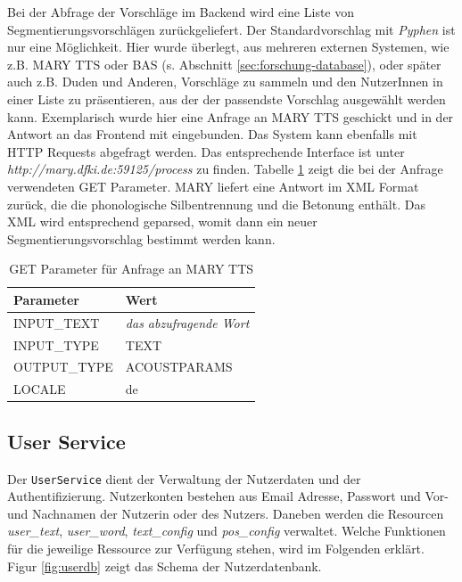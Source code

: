 Bei der Abfrage der Vorschläge im Backend wird eine Liste von Segmentierungsvorschlägen zurückgeliefert. Der Standardvorschlag mit \textit{Pyphen} ist nur eine Möglichkeit. Hier wurde überlegt, aus mehreren externen Systemen, wie z.B. MARY TTS oder BAS (s. Abschnitt \ref{sec:forschung-database}), oder später auch z.B. Duden und Anderen, Vorschläge zu sammeln und den NutzerInnen in einer Liste zu präsentieren, aus der der passendste Vorschlag ausgewählt werden kann. Exemplarisch wurde hier eine Anfrage an MARY TTS geschickt und in der Antwort an das Frontend mit eingebunden. Das System kann ebenfalls mit HTTP Requests abgefragt werden. Das entsprechende Interface ist unter \textit{http://mary.dfki.de:59125/process} zu finden. Tabelle \ref{table:mary} zeigt die bei der Anfrage verwendeten GET Parameter. MARY liefert eine Antwort im XML Format zurück, die die phonologische Silbentrennung und die Betonung enthält. Das XML wird entsprechend geparsed, womit dann ein neuer Segmentierungsvorschlag bestimmt werden kann.

\begin{table}[h!]
	\centering
	\begin{tabular}{|l|l|}
		\hline
		\textbf{Parameter} & \textbf{Wert}\\
		\hline
		\hline
		INPUT\_TEXT & \textit{das abzufragende Wort}\\
		INPUT\_TYPE & TEXT\\
		OUTPUT\_TYPE & ACOUSTPARAMS\\
		LOCALE & de\\
		\hline
	\end{tabular}
	\caption{GET Parameter für Anfrage an MARY TTS}
	\label{table:mary}
\end{table}

\subsection{User Service}
\label{sec:userservice}

Der \texttt{UserService} dient der Verwaltung der Nutzerdaten und der Authentifizierung. Nutzerkonten bestehen aus Email Adresse, Passwort und Vor- und Nachnamen der Nutzerin oder des Nutzers. Daneben werden die Resourcen \textit{user\_text}, \textit{user\_word}, \textit{text\_config} und \textit{pos\_config} verwaltet. Welche Funktionen für die jeweilige Ressource zur Verfügung stehen, wird im Folgenden erklärt. Figur \ref{fig:userdb} zeigt das Schema der Nutzerdatenbank.

